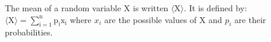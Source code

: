 The mean of a random variable X is written $ \langle \mathrm{X} \rangle . $
It is defined by: $ \langle \mathrm{X} \rangle = \sum _{\mathrm{i=1}}^{\mathrm{n}}
\mathrm{p}_{\mathrm{i}} \mathrm{x}_{\mathrm{i}} $ where $x_{i}$  are
the possible values of X and $p_{i}$  are their probabilities.